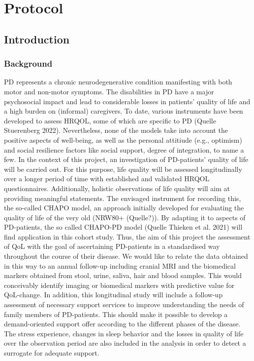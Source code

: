 \chapter{Protocol}
\section{Introduction}
\subsection{Background}
\acl{PD} represents a chronic neurodegenerative condition manifesting with both motor and non-motor symptoms. The disabilities in \ac{PD} have a major psychosocial impact and lead to considerable losses in patients' quality of life and a high burden on (informal) caregivers. To date, various instruments have been developed to assess \ac{HRQOL}, some of which are specific to \ac{PD} (Quelle Stuerenberg 2022). Nevertheless, none of the models take into account the positive aspects of well-being, as well as the personal attitiude (e.g., optimism) and social resilience factors like social support, degree of integration, to name a few. In the context of this project, an investigation of \ac{PD}-patients' quality of life will be carried out. For this purpose, life quality will be assessed longitudinally over a longer period of time with established and validated \ac{HRQOL} questionnaires. Additionally, holistic observations of life quality will aim at providing meaningful statements. The envisaged instrument for recording this, the so-called \ac{CHAPO} model, an approach initially developed for evaluating the quality of life of the very old (NRW80+ (Quelle?)). By adapting it to aspects of \ac{PD}-patients, the so called \acs{CHAPO}-\ac{PD} model (Quelle Thieken et al. 2021) will find application in this cohort study. Thus, the aim of this project the assessment of \ac{QoL} with the goal of ascertaining \ac{PD}-patients in a standardised way throughout the course of their disease. We would like to relate the data obtained in this way to an annual follow-up including cranial \ac{MRI} and the biomedical markers obtained from stool, urine, saliva, hair and blood samples. This would conceivably identify imaging or biomedical markers with predictive value for \ac{QoL}-change. In addition, this longitudinal study will include a follow-up assessment of necessary support services to improve understanding the needs of family members of \ac{PD}-patients. This should make it possible to develop a demand-oriented support offer according to the different phases of the disease. The stress experience, changes in sleep behavior and the losses in quality of life over the observation period are also included in the analysis in order to detect a surrogate for adequate support.

